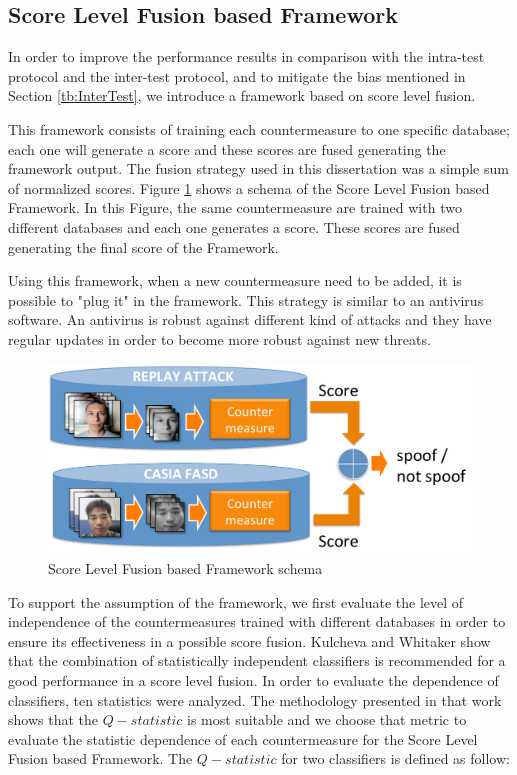 \subsection{Score Level Fusion based Framework}
\label{sec:framework}

In order to improve the performance results in comparison with the intra-test protocol and the inter-test protocol, and to mitigate the bias mentioned in Section \ref{tb:InterTest}, we introduce a framework based on score level fusion. 

This framework consists of training each countermeasure to one specific database; each one will generate a score and these scores are fused generating the framework output. The fusion strategy used in this dissertation was a simple sum of normalized scores. Figure \ref{img:fusion_framework} shows a schema of the Score Level Fusion based Framework. In this Figure, the same countermeasure are trained with two different databases and each one generates a score. These scores are fused generating the final score of the Framework. 

Using this framework, when a new countermeasure need to be added, it is possible to "plug it" in the framework. This strategy is similar to an antivirus software. An antivirus is robust against different kind of attacks and they have regular updates in  order to become more robust against new threats.

\begin{figure}[!htb]
\begin{center}
\includegraphics [width=12cm] {images/fusion_framework.pdf}
\caption{Score Level Fusion based Framework schema} \label{img:fusion_framework}
\end{center}
\end{figure}


To support the assumption of the framework, we first evaluate the level of independence of the countermeasures trained with different databases in order to ensure its effectiveness in a possible score fusion. Kulcheva and Whitaker \cite{kuncheva2003measures} show that the combination of statistically independent classifiers is recommended for a good performance in a score level fusion. In order to evaluate the dependence of classifiers, ten statistics were analyzed. The methodology presented in that work shows that the $Q-statistic$ is most suitable and we choose that metric to evaluate the statistic dependence of each countermeasure for the Score Level Fusion based Framework. The $Q-statistic$ for two classifiers is defined as follow:

